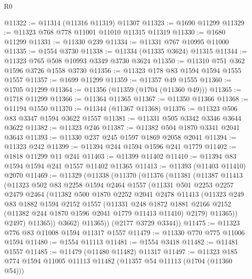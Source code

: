 \begin{lexlean}{R0}
\begin{coremodule}
@11322 := @11314 (@11316 @11319) @11307
@11323 := @1690 @11299
@11329 := @11323 @768 @778 @11001 @11010 @11315 @11319
@11330 := @1680 @11299
@11331 := @11330 @239
@11334 := @11331 @767 @10995 @11000
@11335 := @1554 @3730
@11338 := @11334 (@11335 @3624) @11315
@11344 := @11323 @765 @508 @10993 @3349 @3730 @3624
@11350 := @11310 @751 @362 @1596 @3726 @1558 @3730
@11356 := @11323 @178 @83 @1594 @1594 @1555 @1557
@11357 := @1699 @11299
@11359 := @11357 @49 @1555
@11360 := @1705 @11299
@11364 := @11356 (@11359 (@1704 (@11360 @49)))
@11365 := @1718 @11299
@11366 := @11364 @11365
@11367 := @11350 @11366
@11368 := @11194 @1550
@11370 := @11344 (@11367 @11368)
@11376 := @11323 @506 @83 @3347 @1594 @3622 @1557
@11381 := @11331 @505 @3342 @3346 @3644 @3622
@11382 := @11323 @246
@11387 := @11382 @504 @1870 @3341 @2041 @3643
@11393 := @11330 @237 @245 @1597 @1869 @2058 @2041
@11394 := @11323 @242
@11399 := @11394 @244 @1594 @1596 @241 @1779
@11402 := @1818 @11299 @11 @241
@11403 := @11399 @11402
@11410 := @11394 @83 @1594 @1594 @241 @1557 @11402 @11365
@11413 := @11393 (@11403 @11410) @2070
@11469 := @11329
    (@11338
      (@11370
        (@11376
          (@11381
            (@11387
              @11413
              (@11323
                @502
                @83
                @2258
                @1594
                @2464
                @1557
                (@11331
                  @501
                  @2253
                  @2257
                  @2479
                  @2464
                  (@11382
                    @500
                    @1870
                    @2252
                    @2041
                    @2478
                    @11413
                    (@11323
                      @249
                      @83
                      @1882
                      @1594
                      @2152
                      @1557
                      (@11331
                        @248
                        @1872
                        @1881
                        @2166
                        @2152
                        (@11382 @244 @1870 @1596 @2041 @1779 @11413 @11410)
                        @2179)
                      @11365))
                  @2497)
                @11365))
            @3662)
          @11365))
      (@2177 @3729 @3344))
@11475 := @11323 @776 @83 @11008 @1594 @11317 @1557
@11479 := @11330 @770 @775 @11006 @1594
@11480 := @1554 @11113
@11481 := @1554 @3418
@11482 := @11481 @1557
@11485 := @11479 (@11480 @11482) @11317
@11497 := @11323 @185 @774 @1594 @11005 @11113 @11482 (@11357 @54 @11113 (@1704 (@11360 @54)))

\end{coremodule}
\end{lexlean}
